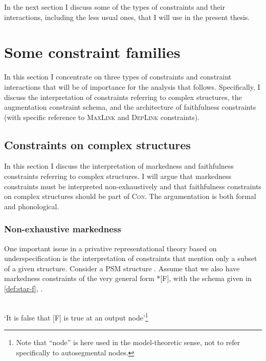 In the next section I discuss some of the types of constraints and their interactions, including the less usual ones, that I will use in the present thesis.

\section{Some constraint families}
\label{sec:some-constr-famil}

In this section I concentrate on three types of constraints and constraint interactions that will be of importance for the analysis that follows. Specifically, I discuss the interpretation of constraints referring to complex structures, the augmentation constraint schema, and the architecture of faithfulness constraints (with specific reference to \textsc{MaxLink} and \textsc{DepLink} constraints).

\subsection{Constraints on complex structures}
\label{sec:constr-compl-struct}

In this section I discuss the interpretation of markedness and faithfulness constraints referring to complex structures. I will argue that markedness constraints must be interpreted non\hyp exhaustively and that faithfulness constraints on complex structures should be part of \textsc{Con}. The argumentation is both formal and phonological.

\subsubsection{Non\hyp exhaustive markedness}
\label{sec:nonhyp-exha-mark}

One important issue in a privative representational theory based on underspecification is the interpretation of constraints that mention only a subset of a given structure. Consider a PSM structure . Assume that we also have markedness constraints of the very general form *[F], with the schema given in \cref{def:star-f}, \cf \citet{potts02:_model_ot}.

\begin{constraint}\label{def:star-f}
\\
`It is false that [F] is true at an output node'\footnote{Note that \enquote{node} is here used in the model\hyp theoretic sense, not to refer specifically to autosegmental nodes.}
\end{constraint}

